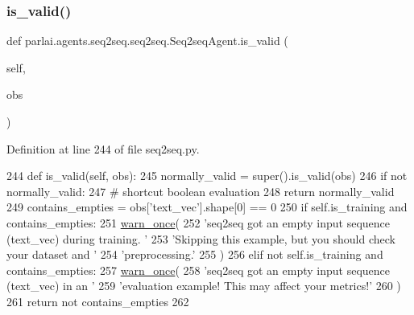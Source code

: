 \mbox{\label{classparlai_1_1agents_1_1seq2seq_1_1seq2seq_1_1Seq2seqAgent_a6fbfdde4ec69ec4050fa4005c6608f1a}} 
\subsubsection{\texorpdfstring{is\+\_\+valid()}{is\_valid()}}
{\footnotesize\ttfamily def parlai.\+agents.\+seq2seq.\+seq2seq.\+Seq2seq\+Agent.\+is\+\_\+valid (\begin{DoxyParamCaption}\item[{}]{self,  }\item[{}]{obs }\end{DoxyParamCaption})}



Definition at line 244 of file seq2seq.\+py.


\begin{DoxyCode}
244     \textcolor{keyword}{def }is\_valid(self, obs):
245         normally\_valid = super().is\_valid(obs)
246         \textcolor{keywordflow}{if} \textcolor{keywordflow}{not} normally\_valid:
247             \textcolor{comment}{# shortcut boolean evaluation}
248             \textcolor{keywordflow}{return} normally\_valid
249         contains\_empties = obs[\textcolor{stringliteral}{'text\_vec'}].shape[0] == 0
250         \textcolor{keywordflow}{if} self.is\_training \textcolor{keywordflow}{and} contains\_empties:
251             \hyperlink{namespaceparlai_1_1utils_1_1misc_a884a3aefa90581f53bc592fa6a78dc43}{warn\_once}(
252                 \textcolor{stringliteral}{'seq2seq got an empty input sequence (text\_vec) during training. '}
253                 \textcolor{stringliteral}{'Skipping this example, but you should check your dataset and '}
254                 \textcolor{stringliteral}{'preprocessing.'}
255             )
256         \textcolor{keywordflow}{elif} \textcolor{keywordflow}{not} self.is\_training \textcolor{keywordflow}{and} contains\_empties:
257             \hyperlink{namespaceparlai_1_1utils_1_1misc_a884a3aefa90581f53bc592fa6a78dc43}{warn\_once}(
258                 \textcolor{stringliteral}{'seq2seq got an empty input sequence (text\_vec) in an '}
259                 \textcolor{stringliteral}{'evaluation example! This may affect your metrics!'}
260             )
261         \textcolor{keywordflow}{return} \textcolor{keywordflow}{not} contains\_empties
262 \end{DoxyCode}
\mbox{\label{classparlai_1_1agents_1_1seq2seq_1_1seq2seq_1_1Seq2seqAgent_a6f94b2896a2a76476f8646ec7d9360ed}} 
